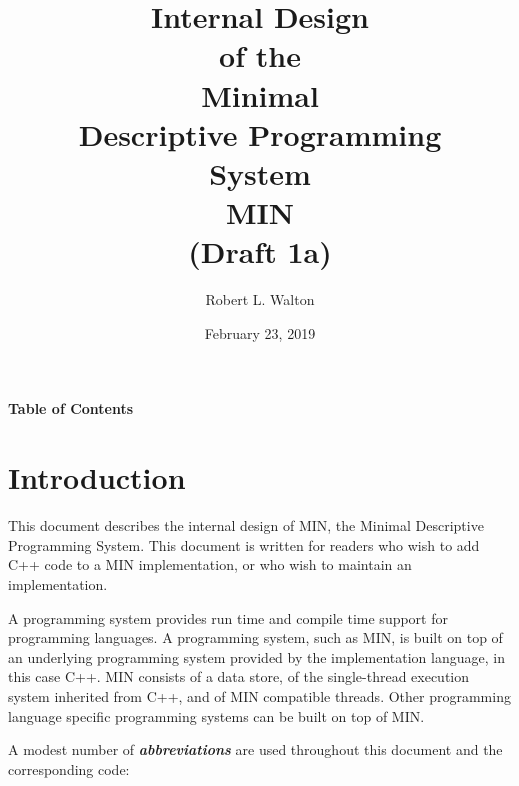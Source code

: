 \documentclass[12pt]{article}
\makeatletter
\renewcommand\tableofcontents{%
    \begin{list}{}%
	     {\setlength{\itemsep}{0in}%
	      \setlength{\topsep}{0in}%
	      \setlength{\parsep}{1ex}%
	      \setlength{\labelwidth}{0in}%
	      \setlength{\baselineskip}{1.5ex}%
	      \setlength{\leftmargin}{0.8in}%
	      \setlength{\rightmargin}{0.8in}}%
    \item\@starttoc{toc}%
    \end{list}}
\newcommand{\skey}[2]{{\bf \em #1#2}\index{#1}}
\makeatother
\begin{document}
        
\title{Internal Design\\[2ex]of the\\[2ex]
       Minimal\\Descriptive Programming\\System\\[2ex]MIN\\[2ex]
       (Draft 1a)}

\author{Robert L. Walton}

\date{February 23, 2019}
 
\maketitle

\newpage
\begin{center}
\large \bf Table of Contents
\end{center}

\bigskip

\tableofcontents 

\newpage

\section{Introduction}

This document describes the internal design of MIN,
the Minimal Descriptive Programming System.
This document is written for readers who wish to add C++ code
to a MIN implementation, or who wish to maintain an implementation.

A programming system provides run time and compile time support
for programming languages.
A programming system, such as MIN, is
built on top of an underlying programming system provided by the
implementation language, in this case C++.
MIN consists of a data store, of the single-thread execution system
inherited from C++, and of MIN compatible threads.
Other programming language specific
programming systems can be built on top of MIN.

A modest number of \skey{abbreviation}s are used throughout this document
and the corresponding code:
\end{document}
